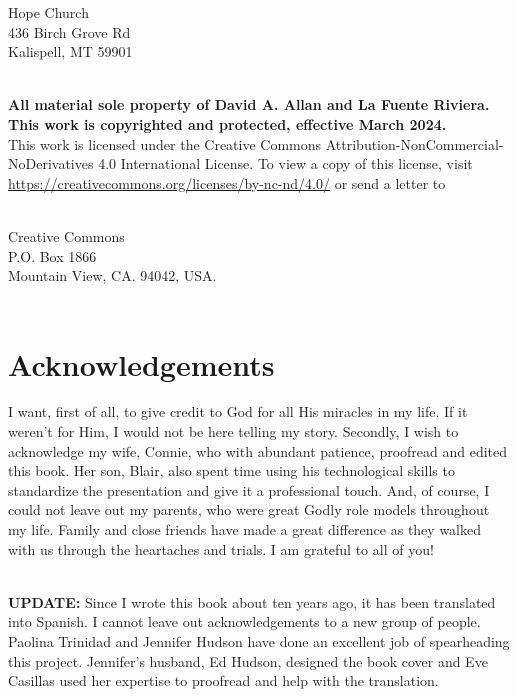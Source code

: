 \documentclass[twoside, 12pt]{book}
\begin{document}
\begin{center}
Hope Church\\
436 Birch Grove Rd\\
Kalispell, MT  59901\\
\
\end{center}

\clearpage 

\textbf{All material sole property of David A. Allan and La Fuente Riviera. This work is copyrighted and protected, effective March 2024.} \\

This work is licensed under the Creative Commons Attribution-NonCommercial-NoDerivatives 4.0 International License. To view a copy of this license, visit\\ \href{https://creativecommons.org/licenses/by-nc-nd/4.0//}{https://creativecommons.org/licenses/by-nc-nd/4.0/} or send a letter to \\
\

\begin{center}
Creative Commons\\
P.O. Box 1866\\
Mountain View, CA. 94042, USA.\\
\
\end{center}

\chapter*{Acknowledgements}
I want, first of all, to give credit to God for all His miracles in my life. If it weren’t for Him, I would not be here telling my story. Secondly, I wish to acknowledge my wife, Connie, who with abundant patience, proofread and edited this book. Her son, Blair, also spent time using his technological skills to standardize the presentation and give it a professional touch. And, of course, I could not leave out my parents, who were great Godly role models throughout my life. Family and close friends have made a great difference as they walked with us through the heartaches and trials. I am grateful to all of you!\\
\

\clearpage

\textbf{UPDATE:}
Since I wrote this book about ten years ago, it has been translated into Spanish. I cannot leave out acknowledgements to a new group of people. Paolina Trinidad and Jennifer Hudson have done an excellent job of spearheading this project. Jennifer’s husband, Ed Hudson, designed the book cover and Eve Casillas used her expertise to proofread and help with the translation.\\
\end{document}
